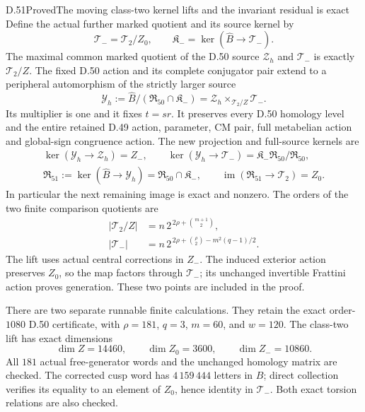 \begin{statement}{D.51}{Proved}{The moving class-two kernel lifts and the invariant residual is exact}
Define the actual further marked quotient and its source kernel by
\[
 \mathcal T_-=\mathcal T_2/Z_0,\qquad
 \mathfrak K_-=\ker(\widehat B\to\mathcal T_-).
 \tag{D.51.4}
\]
The maximal common marked quotient of the D.50
source \(\mathcal Z_h\) and \(\mathcal T_-\) is exactly
\(\mathcal T_2/Z\). The fixed D.50 action and its
complete conjugator pair extend to a peripheral
automorphism of the strictly larger source
\[
 \mathcal Y_h
   :=\widehat B/(\mathfrak R_{50}\cap\mathfrak K_-)
    =\mathcal Z_h
       \times_{\mathcal T_2/Z}\mathcal T_- .
 \tag{D.51.5}
\]
Its multiplier is one and it fixes \(t=sr\).
It preserves every D.50 homology level and the entire
retained D.49 action, parameter, CM pair, full
metabelian action and global-sign congruence action.
The new projection and full-source kernels are
\[
 \begin{gathered}
 \ker(\mathcal Y_h\to\mathcal Z_h)=Z_-,
 \qquad
 \ker(\mathcal Y_h\to\mathcal T_-)
       =\mathfrak K_-\mathfrak R_{50}/\mathfrak R_{50},\\
 \mathfrak R_{51}:=\ker(\widehat B\to\mathcal Y_h)
       =\mathfrak R_{50}\cap\mathfrak K_-,
 \qquad
 \operatorname{im}(\mathfrak R_{51}\to\mathcal T_2)=Z_0 .
 \end{gathered}
 \tag{D.51.6}
\]
In particular the next remaining image is exact and
nonzero. The orders of the two finite comparison
quotients are
\[
 \begin{aligned}
 |\mathcal T_2/Z|
     &=n\,2^{\,2\rho+\binom{m+1}{2}},\\
 |\mathcal T_-|
     &=n\,2^{\,2\rho+\binom{\rho}{2}-m^2(q-1)/2}.
 \end{aligned}
 \tag{D.51.7}
\]
The lift uses actual central corrections in \(Z_-\).
The induced exterior action preserves \(Z_0\), so the
map factors through \(\mathcal T_-\); its unchanged
invertible Frattini action proves generation.
These two points are included in the proof.

There are two separate runnable finite calculations.
They retain the exact order-\(1080\) D.50 certificate,
with \(\rho=181\), \(q=3\), \(m=60\), and \(w=120\).
The class-two lift has exact dimensions
\[
            \dim Z=14460,\qquad
            \dim Z_0=3600,\qquad
            \dim Z_-=10860 .
 \tag{D.51.8}
\]
All \(181\) actual free-generator words and the
unchanged homology matrix are checked. The corrected
cusp word has \(4\,159\,444\) letters in \(B\);
direct collection verifies its equality to an
element of \(Z_0\), hence identity in \(\mathcal T_-\).
Both exact torsion relations are also checked.


\end{statement}
